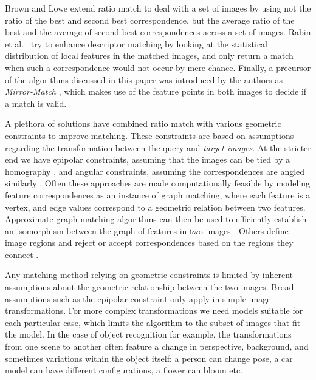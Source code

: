 \documentclass[review]{elsarticle}
\begin{document}
Brown and Lowe \cite{brown2005multi} extend ratio match to deal with a set of images by using not the ratio of the best and second best correspondence, but the average ratio of the best and the average of second best correspondences across a set of images.  Rabin et al.\ \cite{rabin2009statistical} try to enhance descriptor matching by looking at the statistical distribution of local features in the matched images, and only return a match when such a correspondence would not occur by mere chance. Finally, a precursor of the algorithms discussed in this paper was introduced by the authors as \emph{Mirror-Match} \cite{arnfred2013mirror}, which makes use of the feature points in both images to decide if a match is valid.

A plethora of solutions have combined ratio match with various geometric constraints to improve matching. These constraints are based on assumptions regarding the transformation between the query and \emph{target images}. At the stricter end we have epipolar constraints, assuming that the images can be tied by a homography \cite{torr2000mlesac, chum2005matching}, and angular constraints, assuming the correspondences are angled similarly \cite{kim2008efficient, schmid1997local}. Often these approaches are made computationally feasible by modeling feature correspondences as an instance of graph matching, where each feature is a vertex, and edge values correspond to a geometric relation between two features. Approximate graph matching algorithms can then be used to efficiently establish an isomorphism between the graph of features in two images \cite{leordeanu2005spectral, torresani2008feature, yarkony2010covering, yuan2012efficient}. Others define image regions and reject or accept correspondences based on the regions they connect \cite{cho2009feature, wu2011robust}.

Any matching method relying on geometric constraints is limited by inherent assumptions about the geometric relationship between the two images. Broad assumptions such as the epipolar constraint only apply in simple image transformations. For more complex transformations we need models suitable for each particular case, which limits the algorithm to the subset of images that fit the model.  In the case of object recognition for example, the transformations from one scene to another often feature a change in perspective, background, and sometimes variations within the object itself: a person can change pose, a car model can have different configurations, a flower can bloom etc.
\end{document}
